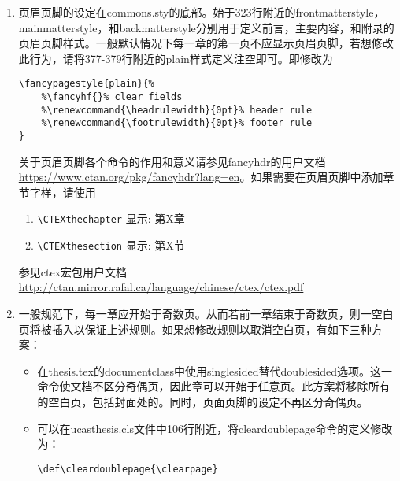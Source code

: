 \begin{enumerate}
      如果\LaTeX{}软件版本比较老旧，如Linux用户，ctex宏包没有更新，设置启用adobe的字体则为:

      \verb+\documentclass[doublesided,adobefonts]{Style/ucasthesis}%+
     
     最后选择xelatex编译引擎编译。

     因为模版的设定考虑兼顾不同操作系统(Windows, Linux, Mac OS)并兼顾pdflatex和xelatex，为了模版的健壮性，上述方案并未作为原始设定。
 \item 页眉页脚的设定在commons.sty的底部。始于323行附近的frontmatterstyle，mainmatterstyle，和backmatterstyle分别用于定义前言，主要内容，和附录的页眉页脚样式。一般默认情况下每一章的第一页不应显示页眉页脚，若想修改此行为，请将377-379行附近的plain样式定义注空即可。即修改为

\begin{verbatim}
\fancypagestyle{plain}{%
    %\fancyhf{}% clear fields
    %\renewcommand{\headrulewidth}{0pt}% header rule
    %\renewcommand{\footrulewidth}{0pt}% footer rule
}
\end{verbatim}
     
     关于页眉页脚各个命令的作用和意义请参见fancyhdr的用户文档 \url{https://www.ctan.org/pkg/fancyhdr?lang=en}。如果需要在页眉页脚中添加章节字样，请使用
      \begin{enumerate}
          \item \verb+\CTEXthechapter+  显示: 第X章
          \item \verb+\CTEXthesection+  显示: 第X节
      \end{enumerate}
      参见ctex宏包用户文档 \url{http://ctan.mirror.rafal.ca/language/chinese/ctex/ctex.pdf}
  \item 一般规范下，每一章应开始于奇数页。从而若前一章结束于奇数页，则一空白页将被插入以保证上述规则。如果想修改规则以取消空白页，有如下三种方案：
\begin{itemize}
    \item 在thesis.tex的documentclass中使用singlesided替代doublesided选项。这一命令使文档不区分奇偶页，因此章可以开始于任意页。此方案将移除所有的空白页，包括封面处的。同时，页面页脚的设定不再区分奇偶页。
    \item 可以在ucasthesis.cls文件中106行附近，将cleardoublepage命令的定义修改为：

      \verb|\def\cleardoublepage{\clearpage}|


\end{itemize}
\end{enumerate}
